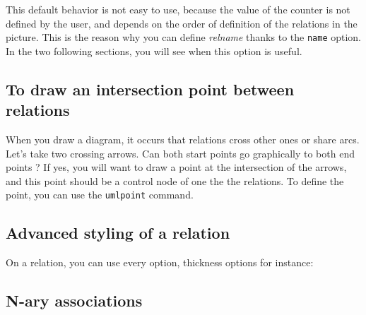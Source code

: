\documentclass[a4paper,11pt]{report}
\begin{document}
This default behavior is not easy to use, because the value of the counter is not defined by the user, and depends on the order of definition of the relations in the picture. This is the reason why you can define {\it relname} thanks to the {\tt name} option. In the two following sections, you will see when this option is useful.

\subsection{To draw an intersection point between relations}\label{ss.relpt}

When you draw a diagram, it occurs that relations cross other ones or share arcs. Let's take two crossing arrows.
Can both start points go graphically to both end points ? If yes, you will want to draw a point at the intersection of the arrows, and this point should be a control node of one the the relations. To define the point, you can use the {\tt umlpoint} command.

\medskip

\begin{minipage}{0.5\textwidth}
	
\end{minipage}
\begin{minipage}{0.4\textwidth}
	\begin{center}
	\end{center}
\end{minipage}

\medskip

\subsection{Advanced styling of a relation}\label{ss.reladvstyle}

On a relation, you can use every \TikZ option, thickness options for instance:

\medskip

\begin{minipage}{0.5\textwidth}
	
\end{minipage}
\begin{minipage}{0.4\textwidth}
	\begin{center}
	\end{center}
\end{minipage}

\medskip

\subsection{N-ary associations}\label{ss.naryassoc}
\end{document}
